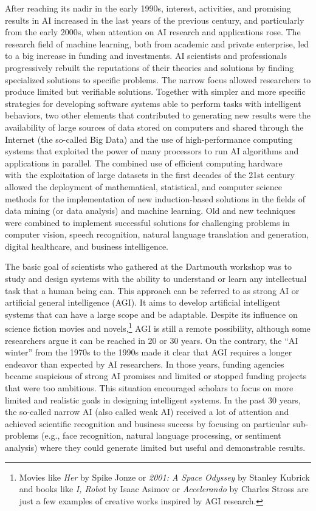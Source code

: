 After reaching its nadir in the early 1990s, interest, activities, and promising results in AI increased in the last years of the previous century, and particularly from the early 2000s, when attention on AI research and applications rose. The research field of machine learning, both from academic and private enterprise, led to a big increase in funding and investments. AI scientists and professionals progressively rebuilt the reputations of their theories and solutions by finding specialized solutions to specific problems. The narrow focus allowed researchers to produce limited but verifiable solutions. Together with simpler and more specific strategies for developing software systems able to perform tasks with intelligent behaviors, two other elements that contributed to generating new results were the availability of large sources of data stored on computers and shared through the Internet (the so-called Big Data) and the use of high-performance computing systems that exploited the power of many processors to run AI algorithms and applications in parallel. The combined use of efficient computing hardware with~the exploitation of large datasets in the first decades of the 21st century allowed the deployment of mathematical, statistical, and computer science methods for the implementation of new induction-based solutions in the fields of data mining (or data analysis) and machine learning. Old and new techniques were combined to implement successful solutions for challenging problems in computer vision, speech recognition, natural language translation and generation, digital healthcare, and business intelligence.

The basic goal of scientists who gathered at the Dartmouth workshop was to study and design systems with the ability to understand or learn any intellectual task that a human being can. This approach can be referred to as strong AI or artificial general intelligence (AGI). It aims to develop artificial intelligent systems that can have a large scope and be adaptable. Despite its influence on science fiction movies and novels,\footnote{Movies like \textit{Her} by Spike Jonze or \textit{2001: A Space Odyssey} by Stanley Kubrick and books like \textit{I, Robot} by Isaac Asimov or \textit{Accelerando} by Charles Stross are just a few examples of creative works inspired by AGI research.} AGI is still a remote possibility, although some researchers argue it can be reached in 20 or 30 years. On the contrary, the ``AI winter'' from the 1970s to the 1990s made it clear that AGI requires a longer endeavor than expected by AI researchers. In those years, funding agencies became suspicious of strong AI promises and limited or stopped funding projects that were too ambitious. This situation encouraged scholars to focus on more limited and realistic goals in designing intelligent systems. In the past 30 years, the so-called narrow AI (also called weak AI) received a lot of attention and achieved scientific recognition and business success by focusing on particular sub-problems (e.g., face recognition, natural language processing, or sentiment analysis) where they could generate limited but useful and demonstrable results.

